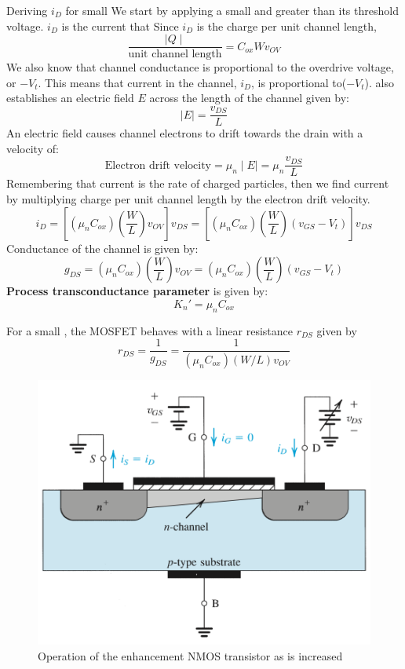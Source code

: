\begin{Analysis}{Deriving $i_D$ for small \vds}{}
    We start by applying a small \vds and \vgs greater than its threshold voltage. $i_D$ is the current that Since $i_D$ is the charge per unit channel length, 
        \[\frac{\mid Q \mid}{\text{unit channel length}} = C_{ox} W v_{OV}\]
    We also know that channel conductance is proportional to the overdrive voltage, or \vgs $-V_t$. This means that current in the channel, $i_D$, is proportional to(\vgs $-V_t$). \vds also establishes an electric field $E$ across the length of the channel given by:
        \[\mid E \mid = \frac{v_{DS}}{L}\]
    An electric field causes channel electrons to drift towards the drain with a velocity of:
        \[\text{Electron drift velocity} = \mu_n \mid E \mid = \mu_n \frac{v_{DS}}{L}\] 
    Remembering that current is the rate of charged particles, then we find current by multiplying charge per unit channel length by the electron drift velocity.
        \[i_D = [(\mu_n C_{ox}) (\frac{W}{L}) v_{OV}] v_{DS} = [(\mu_n C_{ox}) (\frac{W}{L}) (v_{GS} - V_t)] v_{DS}\]
    Conductance of the channel is given by:
        \[g_{DS} = (\mu_n C_{ox}) (\frac{W}{L}) v_{OV} = (\mu_n C_{ox}) (\frac{W}{L}) (v_{GS} - V_t)\]
    \textbf{Process transconductance parameter} is given by:
        \[K_n' = \mu_n C_{ox}\]
\end{Analysis}

For a small \vds, the MOSFET behaves with a linear resistance $r_{DS}$ given by
    \[r_{DS} = \frac{1}{g_{DS}} = \frac{1}{(\mu_n C_{ox})(W/L)v_{OV}}\]

\begin{figure}[htb]
    \centering
    \includegraphics[scale=0.5]{figs/ch05/increase_vds.png}
    \caption{Operation of the enhancement NMOS transistor as \vds is increased}
    \label{fig:increase_vds}
\end{figure}

